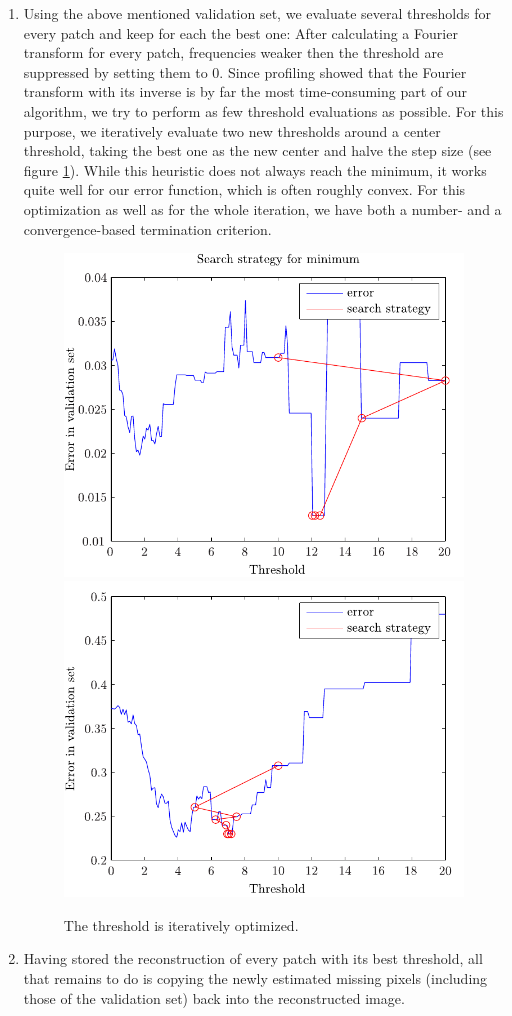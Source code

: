 \documentclass[10pt,conference,compsocconf]{IEEEtran}
\begin{document}
\begin{enumerate}
\item Using the above mentioned validation set, we evaluate several thresholds for every patch and keep for each the best one: After calculating a Fourier transform for every patch, frequencies weaker then the threshold are suppressed by setting them to 0. Since profiling showed that the Fourier transform with its inverse is by far the most time-consuming part of our algorithm, we try to perform as few threshold evaluations as possible. For this purpose, we iteratively evaluate two new thresholds around a center threshold, taking the best one as the new center and halve the step size (see figure \ref{threshold_optimization}). While this heuristic does not always reach the minimum, it works quite well for our error function, which is often roughly convex. For this optimization as well as for the whole iteration, we have both a number- and a convergence-based termination criterion.

\begin{figure}
\centering
\includegraphics[width=0.8\columnwidth]{../plots/search_strategy_6.pdf}
\includegraphics[width=0.8\columnwidth]{../plots/search_strategy_2.pdf}
\caption{The threshold is iteratively optimized.}
\label{threshold_optimization}
\end{figure}

\item Having stored the reconstruction of every patch with its best threshold, all that remains to do is copying the newly estimated missing pixels (including those of the validation set) back into the reconstructed image.
\end{enumerate}
\end{document}
